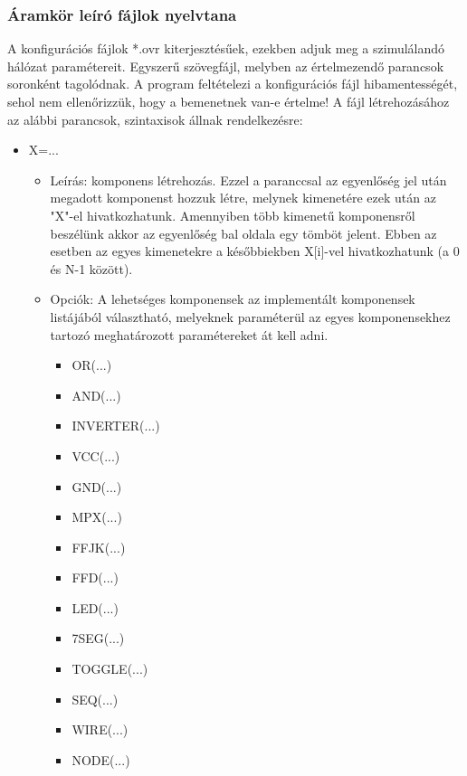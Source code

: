 \subsubsection{Áramkör leíró fájlok nyelvtana}
A konfigurációs fájlok *.ovr kiterjesztésűek, ezekben adjuk meg a szimulálandó hálózat paramétereit. Egyszerű szövegfájl, melyben az értelmezendő parancsok soronként tagolódnak. A program feltételezi a konfigurációs fájl hibamentességét, sehol nem ellenőrizzük, hogy a bemenetnek van-e értelme!\linebreak
A fájl létrehozásához az alábbi parancsok, szintaxisok állnak rendelkezésre:

\begin{itemize}
\item X=...
	\begin{itemize}
	\item Leírás: komponens létrehozás. Ezzel a paranccsal az egyenlőség jel után megadott komponenst hozzuk létre, melynek kimenetére ezek után az "X"-el hivatkozhatunk. Amennyiben több kimenetű komponensről beszélünk akkor az egyenlőség bal oldala egy tömböt jelent. Ebben az esetben az egyes kimenetekre a későbbiekben X[i]-vel hivatkozhatunk (a 0 és N-1 között).
	\item Opciók: A lehetséges komponensek az implementált komponensek listájából választható, melyeknek paraméterül az egyes komponensekhez tartozó meghatározott paramétereket át kell adni.
		\begin{itemize}
			\item OR(...)			%
			\item AND(...)			%
			\item INVERTER(...)		%
			\item VCC(...)			%
			\item GND(...)			%
			\item MPX(...)			%
			\item FFJK(...)			%
			\item FFD(...)			%
			\item LED(...)			%
			\item 7SEG(...)			%
			\item TOGGLE(...)		%
			\item SEQ(...)			%
			\item WIRE(...)			%
			\item NODE(...)			%
		\end{itemize}
	\end{itemize}


\end{itemize}
